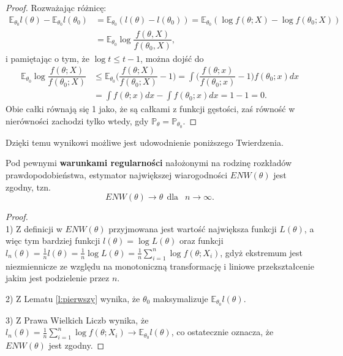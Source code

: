 \begin{proof}
Rozważając różnicę:
\begin{equation*}
\begin{split}
\mathbb{E}_{\theta_0}l(\theta) - \mathbb{E}_{\theta_0}l(\theta_0) & = \mathbb{E}_{\theta_0}(l(\theta) - l(\theta_0) ) = \mathbb{E}_{\theta_0}(\log f(\theta; X) - \log f(\theta_0; X)) \\
 & = \mathbb{E}_{\theta_0}\log\dfrac{f(\theta, X)}{f(\theta_0, X)},
\end{split}
\end{equation*}
i pamiętając o tym, że $\log t \leq t - 1$, można dojść do
\begin{equation*}
\begin{split}
\mathbb{E}_{\theta_0}\log\dfrac{f(\theta; X)}{f(\theta_0; X)} & \leq \mathbb{E}_{\theta_0}\Big(\dfrac{f(\theta; X)}{f(\theta_0; X)} - 1 \Big) = \int \Big(\dfrac{f(\theta; x)}{f(\theta_0; x)} - 1 \Big) f(\theta_0;x) dx \\ 
& = \int f(\theta;x)dx - \int f(\theta_0;x)dx = 1-1 =0.
\end{split}
\end{equation*}
Obie całki równają się 1 jako, że są całkami z funkcji gęstości, zaś równość w nierówności zachodzi tylko wtedy, gdy  $\mathbb{P}_{\theta}=\mathbb{P}_{\theta_0}$.
\end{proof}

Dzięki temu wynikowi możliwe jest udowodnienie poniższego Twierdzenia.

\begin{theorem}
Pod pewnymi \textbf{warunkami regularności} nałożonymi na rodzinę rozkładów prawdopodobieństwa, estymator największej wiarogodności $ENW(\theta)$ jest zgodny, tzn. 
$$ENW(\theta) \rightarrow \theta \ \ \text{dla } \ \ n \rightarrow \infty.$$
\end{theorem}
\begin{proof}
\ \\
1) Z definicji w $ENW(\theta)$ przyjmowana jest wartość największa funkcji $L(\theta)$, a więc tym bardziej funkcji $ l(\theta) = \log L(\theta)$ oraz funkcji $ l_n(\theta) = \frac{1}{n}l(\theta) = \frac{1}{n}\log L(\theta) = \frac{1}{n}\sum\limits_{i=1}^{n}\log f(\theta;X_i)$, gdyż ekstremum jest niezmiennicze ze względu na monotoniczną transformację i liniowe przekształcenie jakim jest podzielenie przez $n$.

2) Z Lematu \ref{l:pierwszy} wynika, że $\theta_0$ maksymalizuje $\mathbb{E}_{\theta_0}l(\theta)$.

3) Z Prawa Wielkich Liczb wynika, że $ l_n(\theta) = \frac{1}{n}\sum\limits_{i=1}^{n}\log f(\theta;X_i) \rightarrow \mathbb{E}_{\theta_0}l(\theta)$, co ostatecznie oznacza, że $ENW(\theta)$ jest zgodny.
\end{proof}

